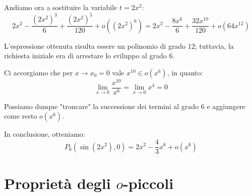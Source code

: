 \documentclass[12pt]{report}
\begin{document}
	Andiamo ora a sostituire la variabile $t = 2x^2$:
	\[
	2x^2 - \frac{(2x^2)^3}{6} + \frac{(2x^2)^5}{120} + o((2x^2)^6) = 2x^2 - \frac{8x^6}{6} + \frac{32x^{10}}{120} + o(64x^{12})
	\]
	
	L'espressione ottenuta risulta essere un polinomio di grado $12$; tuttavia, la richiesta iniziale era di arrestare lo sviluppo al grado $6$.
	
	Ci accorgiamo che per $x \to x_0 = 0$ vale $x^{10} \in o(x^6)$, in quanto:
	\[
	\lim_{x \to 0} \frac{x^{10}}{x^6} = \lim_{x \to 0} x^4 = 0
	\]
	
	Possiamo dunque "troncare" la successione dei termini al grado $6$ e aggiungere come resto $o(x^6)$.
	
	In conclusione, otteniamo:
	\[
	P_6(\sin(2x^2), 0) = 2x^2 - \frac{4}{3}x^6 + o(x^6)
	\]
	
	\section{Proprietà degli $o$-piccoli}
	
\end{document}
